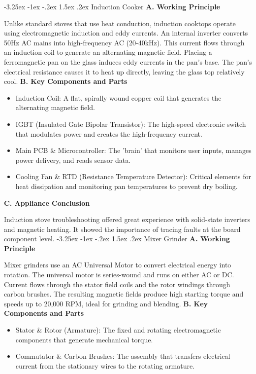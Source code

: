 \documentclass[11pt,a4paper]{report}
\makeatletter
\renewcommand{\section}{\@startsection{section}{1}{\z@}%
  {-3.25ex \@plus -1ex \@minus -.2ex}%
  {1.5ex \@plus.2ex}%
  {\normalfont\Large\bfseries\color{primaryColor}}}
\makeatother
\begin{document}
\section{Induction Cooker}
\noindent\textbf{A. Working Principle}\par\medskip
Unlike standard stoves that use heat conduction, induction cooktops operate using electromagnetic induction and eddy currents. An internal inverter converts 50Hz AC mains into high-frequency AC (20-40kHz). This current flows through an induction coil to generate an alternating magnetic field. Placing a ferromagnetic pan on the glass induces eddy currents in the pan's base. The pan's electrical resistance causes it to heat up directly, leaving the glass top relatively cool.
\noindent\textbf{B. Key Components and Parts}\par\medskip
\begin{itemize}
  \item Induction Coil: A flat, spirally wound copper coil that generates the alternating magnetic field.
  \item IGBT (Insulated Gate Bipolar Transistor): The high-speed electronic switch that modulates power and creates the high-frequency current.
  \item Main PCB \& Microcontroller: The 'brain' that monitors user inputs, manages power delivery, and reads sensor data.
  \item Cooling Fan \& RTD (Resistance Temperature Detector): Critical elements for heat dissipation and monitoring pan temperatures to prevent dry boiling.
\end{itemize}
\noindent\textbf{C. Appliance Conclusion}\par\medskip
Induction stove troubleshooting offered great experience with solid-state inverters and magnetic heating. It showed the importance of tracing faults at the board component level.
\section{Mixer Grinder}
\noindent\textbf{A. Working Principle}\par\medskip
Mixer grinders use an AC Universal Motor to convert electrical energy into rotation. The universal motor is series-wound and runs on either AC or DC. Current flows through the stator field coils and the rotor windings through carbon brushes. The resulting magnetic fields produce high starting torque and speeds up to 20,000 RPM, ideal for grinding and blending.
\noindent\textbf{B. Key Components and Parts}\par\medskip
\begin{itemize}
  \item Stator \& Rotor (Armature): The fixed and rotating electromagnetic components that generate mechanical torque.
  \item Commutator \& Carbon Brushes: The assembly that transfers electrical current from the stationary wires to the rotating armature.
\end{itemize}
\end{document}
